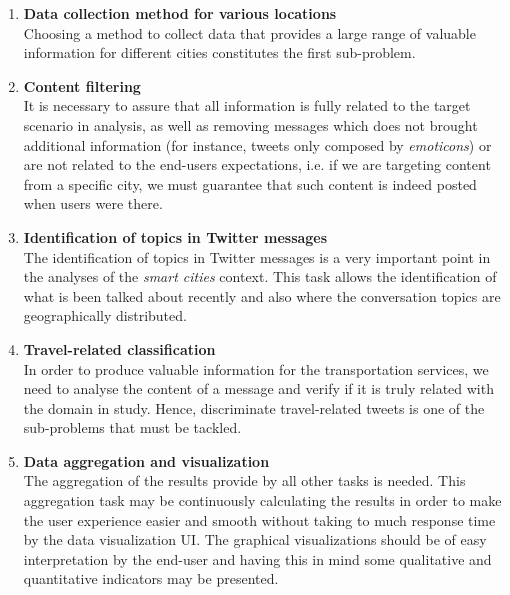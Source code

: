\begin{enumerate}
	\item \textbf{Data collection method for various locations}\\Choosing a method to collect data that provides a large range of valuable information for different cities constitutes the first sub-problem.
	
	\item \textbf{Content filtering}\\It is necessary to assure that all information is fully related to the target scenario in analysis, as well as removing messages which does not brought additional information (for instance, tweets only composed by \textit{emoticons}) or are not related to the end-users expectations, i.e. if we are targeting content from a specific city, we must guarantee that such content is indeed posted when users were there.
	
	\item \textbf{Identification of topics in Twitter messages}\\The identification of topics in Twitter messages is a very important point in the analyses of the \textit{smart cities} context. This task allows the identification of what is been talked about recently and also where the conversation topics are geographically distributed.
	
	\item \textbf{Travel-related classification}\\In order to produce valuable information for the transportation services, we need to analyse the content of a message and verify if it is truly related with the domain in study. Hence, discriminate travel-related tweets is one of the sub-problems that must be tackled.
	
	\item \textbf{Data aggregation and visualization}\\The aggregation of the results provide by all other tasks is needed. This aggregation task may be continuously calculating the results in order to make the user experience easier and smooth without taking to much response time by the data visualization UI. The graphical visualizations should be of easy interpretation by the end-user and having this in mind some qualitative and quantitative indicators may be presented.
\end{enumerate}

